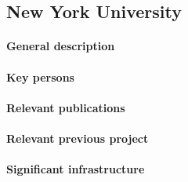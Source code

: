 \subsection{New York University}
\label{sec:nyu}

\paragraph{General description}

\paragraph{Key persons}

\paragraph{Relevant publications}

\paragraph{Relevant previous project}

\paragraph{Significant infrastructure}